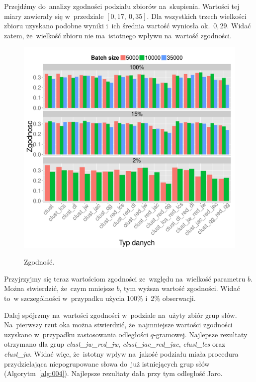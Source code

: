 \documentclass{praca1}
\begin{document}
Przejdźmy do~analizy zgodności podziału zbiorów na~skupienia. Wartości tej miary zawierały się w~przedziale $[0,\!17,\ 0,\!35]$. Dla wszystkich trzech wielkości zbioru uzyskano podobne wyniki i~ich średnia wartość wyniosła ok.~$0{,}29$. Widać zatem, że~wielkość zbioru nie ma~istotnego wpływu na~wartość zgodności.


\begin{figure}[!h]
  \centering
  \includegraphics[width=420pt]{plot11.pdf}\\
  \caption{Zgodność.}\label{plot:006}
\end{figure}

Przyjrzyjmy się teraz wartościom zgodności ze~względu na~wielkość parametru $b$. Można stwierdzić, że~czym mniejsze $b$, tym wyższa wartość zgodności. Widać to~w szczególności w~przypadku użycia 100\% i~2\% obserwacji.

Dalej spójrzmy na~wartości zgodności w~podziale na~użyty zbiór grup słów. Na~pierwszy rzut oka można stwierdzić, że~najmniejsze wartości zgodności uzyskano w~przypadku zastosowania odległości $q$-gramowej. Najlepsze rezultaty otrzymano dla grup \emph{clust\_jw\_red\_jw}, \emph{clust\_jac\_red\_jac}, \emph{clust\_lcs} oraz \emph{clust\_jw}. Widać więc, że~istotny wpływ na~jakość podziału miała procedura przydzielająca niepogrupowane słowa do~już istniejących grup słów (Algorytm~\ref{alg:004}). Najlepsze rezultaty dała przy tym odległość Jaro.
\end{document}
